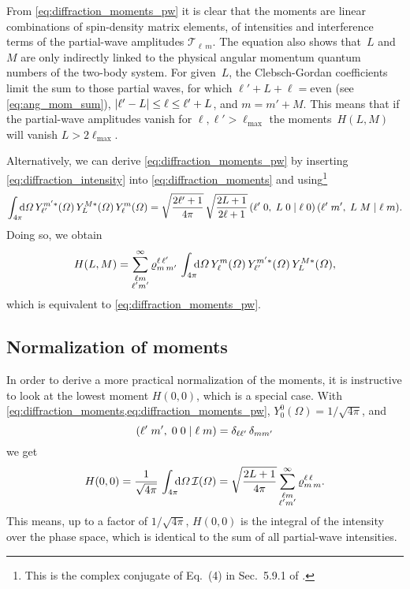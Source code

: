 From \cref{eq:diffraction_moments_pw} it is clear that the moments are
linear combinations of spin-density matrix elements, \ie of
intensities and interference terms of the partial-wave amplitudes
$\mathcal{T}_{\ell\, m}$.  The equation also shows that~$L$ and~$M$
are only indirectly linked to the physical angular momentum quantum
numbers of the two-body system.  For given~$L$, the Clebsch-Gordan
coefficients limit the sum to those partial waves, for which $\ell' +
L + \ell = \text{even}$ (see \cref{eq:ang_mom_sum}), $\vert{\ell' - L}\vert
\leq \ell \leq \ell' + L$, and $m = m' + M$.  This means that if the
partial-wave amplitudes vanish for $\ell, \ell' > \ell_\text{max}$ the
moments~$H(L, M)$ will vanish $L > 2 \ell_\text{max}$.

Alternatively, we can derive \cref{eq:diffraction_moments_pw} by
inserting \cref{eq:diffraction_intensity} into
\cref{eq:diffraction_moments} and using\footnote{This is the complex
conjugate of Eq.~(4) in Sec.~5.9.1 of .}
\begin{equation}
  \label{eq:spherical_harm_clebsch}
  \int_{4 \pi}\!\!\! \dif{\Omega}\,
  Y_{\ell'}^{m' *}(\Omega)\, Y_L^{M *}(\Omega)\, Y_{\ell}^m(\Omega)
  = \sqrt{\frac{2 \ell' + 1}{4 \pi}}\, \sqrt{\frac{2 L + 1}{2 \ell + 1}}\, \clebsch{\ell'}{0}{L}{0}{\ell}{0}\, \clebsch{\ell'}{m'}{L}{M}{\ell}{m}.
\end{equation}
Doing so, we obtain
\begin{equation}
  H(L, M)
  = \sum_{\substack{\ell m \\ \ell' m'}}^\infty
  \varrho^{\ell\, \ell'}_{m\, m'}\,
  \int_{4 \pi}\!\!\! \dif{\Omega}\,
  Y_\ell^m(\Omega)\,
  Y_{\ell'}^{m' *}(\Omega)\,
  Y_L^{M *}(\Omega),
\end{equation}
which is equivalent to \cref{eq:diffraction_moments_pw}.


\subsection{Normalization of moments}%
\label{sec:diffraction:moments_norm}

In order to derive a more practical normalization of the moments, it
is instructive to look at the lowest moment $H(0, 0)$, which is a
special case.  With
\cref{eq:diffraction_moments,eq:diffraction_moments_pw},
$Y_0^0(\Omega) = 1 / \sqrt{4 \pi}$, and
\begin{equation}
  ({\ell'}\;{m'},\;{0}\;{0}\; |\; {\ell}\;{m})
  = \delta_{\ell \ell'}\, \delta_{m m'}
\end{equation}
we get
\begin{equation}
  H(0, 0)
  = \frac{1}{\sqrt{4 \pi}}\, \int_{4 \pi}\!\!\! \dif{\Omega}\, \mathcal{I}(\Omega)
  = \sqrt{\frac{2 L + 1}{4 \pi}} \sum_{\substack{\ell m \\ \ell' m'}}^\infty \varrho^{\ell\, \ell}_{m\, m}.
\end{equation}
This means, up to a factor of $1 / \sqrt{4 \pi}$, $H(0, 0)$ is the
integral of the intensity over the phase space, which is identical to
the sum of all partial-wave intensities.

